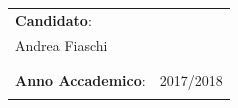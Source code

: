 \begin{titlepage}
\begin{center}
\begin{minipage}{0.8\textwidth}
\begin{flushleft}
\begin{tabular}{l l}
      \\
      {\large \bf{Candidato}}: & {\large{\bf }}\\
      {\large Andrea Fiaschi} & {\large {\bf }}\\
\\
\\
{\large \bf{Anno Accademico}}: & {\large 2017/2018{\bf }}\\
      {\large } & {\large {\bf }}\\
    \end{tabular}
    \vfill
  \end{flushleft} 
 
  \end{minipage}
  \end{center}
\end{titlepage}
